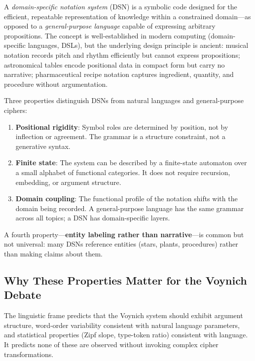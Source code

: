 \documentclass[11pt,a4paper,twocolumn]{article}
\begin{document}
A \textit{domain-specific notation system} (DSN) is a symbolic code designed for the efficient, repeatable representation of knowledge within a constrained domain---as opposed to a \textit{general-purpose language} capable of expressing arbitrary propositions. The concept is well-established in modern computing (domain-specific languages, DSLs), but the underlying design principle is ancient: musical notation records pitch and rhythm efficiently but cannot express propositions; astronomical tables encode positional data in compact form but carry no narrative; pharmaceutical recipe notation captures ingredient, quantity, and procedure without argumentation.

Three properties distinguish DSNs from natural languages and general-purpose ciphers:

\begin{enumerate}[leftmargin=*,itemsep=2pt]
    \item \textbf{Positional rigidity}: Symbol roles are determined by position, not by inflection or agreement. The grammar is a structure constraint, not a generative syntax.
    \item \textbf{Finite state}: The system can be described by a finite-state automaton over a small alphabet of functional categories. It does not require recursion, embedding, or argument structure.
    \item \textbf{Domain coupling}: The functional profile of the notation shifts with the domain being recorded. A general-purpose language has the same grammar across all topics; a DSN has domain-specific layers.
\end{enumerate}

\noindent A fourth property---\textbf{entity labeling rather than narrative}---is common but not universal: many DSNs reference entities (stars, plants, procedures) rather than making claims about them.

\subsection{Why These Properties Matter for the Voynich Debate}

The linguistic frame predicts that the Voynich system should exhibit argument structure, word-order variability consistent with natural language parameters, and statistical properties (Zipf slope, type-token ratio) consistent with language. It predicts none of these are observed without invoking complex cipher transformations.
\end{document}
